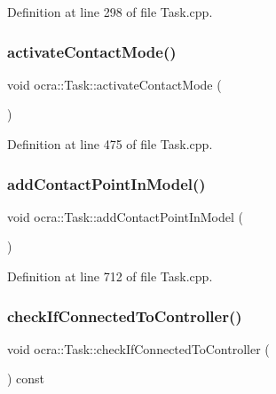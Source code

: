 Definition at line 298 of file Task.\+cpp.

\hypertarget{classocra_1_1Task_ab4ad2ba0aaf593bfdc8f78b30b730786}{}\label{classocra_1_1Task_ab4ad2ba0aaf593bfdc8f78b30b730786} 
\subsubsection{\texorpdfstring{activate\+Contact\+Mode()}{activateContactMode()}}
{\footnotesize\ttfamily void ocra\+::\+Task\+::activate\+Contact\+Mode (\begin{DoxyParamCaption}{ }\end{DoxyParamCaption})}



Definition at line 475 of file Task.\+cpp.

\hypertarget{classocra_1_1Task_ad09f069ad2649ebe9eb2d51f49b2c531}{}\label{classocra_1_1Task_ad09f069ad2649ebe9eb2d51f49b2c531} 
\subsubsection{\texorpdfstring{add\+Contact\+Point\+In\+Model()}{addContactPointInModel()}}
{\footnotesize\ttfamily void ocra\+::\+Task\+::add\+Contact\+Point\+In\+Model (\begin{DoxyParamCaption}{ }\end{DoxyParamCaption})\hspace{0.3cm}{\ttfamily [protected]}}



Definition at line 712 of file Task.\+cpp.

\hypertarget{classocra_1_1Task_adb083abedac149db35284554d6a73b8f}{}\label{classocra_1_1Task_adb083abedac149db35284554d6a73b8f} 
\subsubsection{\texorpdfstring{check\+If\+Connected\+To\+Controller()}{checkIfConnectedToController()}}
{\footnotesize\ttfamily void ocra\+::\+Task\+::check\+If\+Connected\+To\+Controller (\begin{DoxyParamCaption}{ }\end{DoxyParamCaption}) const\hspace{0.3cm}{\ttfamily [protected]}}



